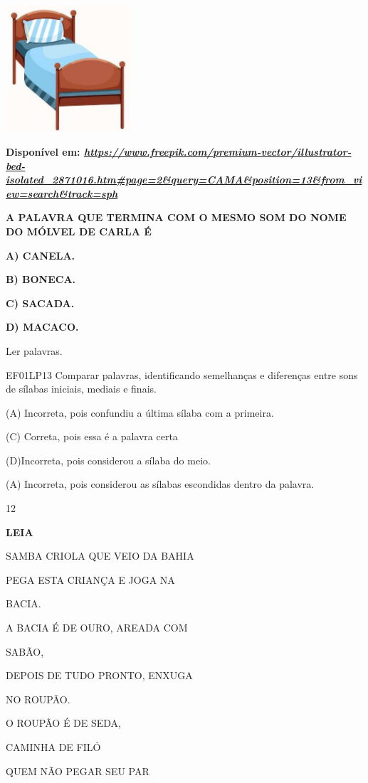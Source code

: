 \begin{escola}
{{{{{{{{{{{{{{{{{{{\includegraphics[width=1.84783in,height=1.84783in]{media/image235.jpg}

\textbf{Disponível em:
\href{https://www.freepik.com/premium-vector/illustrator-bed-isolated_2871016.htm\#page=2\&query=CAMA\&position=13\&from_view=search\&track=sph}{\emph{https://www.freepik.com/premium-vector/illustrator-bed-isolated\_2871016.htm\#page=2\&query=CAMA\&position=13\&from\_view=search\&track=sph}}}

\textbf{A PALAVRA QUE TERMINA COM O MESMO SOM DO NOME DO MÓLVEL DE CARLA
É}

\textbf{A) CANELA.}

\textbf{B) BONECA.}

\textbf{C) SACADA.}

\textbf{D) MACACO.}

Ler palavras.

EF01LP13 Comparar palavras, identificando semelhanças e diferenças entre
sons de sílabas iniciais, mediais e finais.

(A) Incorreta, pois confundiu a última sílaba com a primeira.

(C) Correta, pois essa é a palavra certa

(D)Incorreta, pois considerou a sílaba do meio.

(A) Incorreta, pois considerou as sílabas escondidas dentro da palavra.

\num{12}

\textbf{LEIA}

SAMBA CRIOLA QUE VEIO DA BAHIA

PEGA ESTA CRIANÇA E JOGA NA

BACIA.

A BACIA É DE OURO, AREADA COM

SABÃO,

DEPOIS DE TUDO PRONTO, ENXUGA

NO ROUPÃO.

O ROUPÃO É DE SEDA,

CAMINHA DE FILÓ

QUEM NÃO PEGAR SEU PAR

}}}}}}}}}}}}}}}}}}}
\end{escola}
